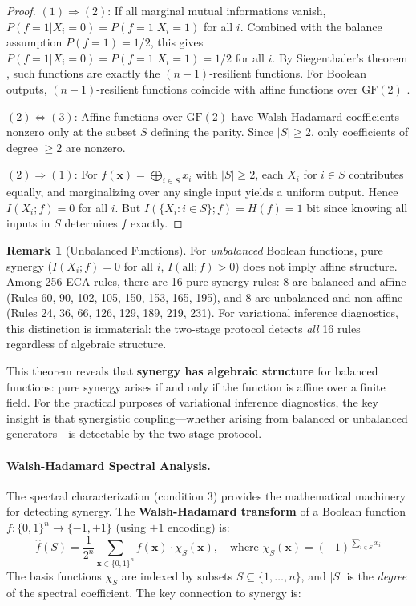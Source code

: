 \documentclass[10pt]{article} %
\theoremstyle{plain}
\theoremstyle{definition}
\newtheorem{remark}[theorem]{Remark}
\begin{document}
\begin{proof}
$(1) \Rightarrow (2)$: If all marginal mutual informations vanish, $P(f = 1 | X_i = 0) = P(f = 1 | X_i = 1)$ for all $i$. Combined with the balance assumption $P(f=1) = 1/2$, this gives $P(f = 1 | X_i = 0) = P(f = 1 | X_i = 1) = 1/2$ for all $i$. By Siegenthaler's theorem \citep{siegenthaler1984correlation}, such functions are exactly the $(n-1)$-resilient functions. For Boolean outputs, $(n-1)$-resilient functions coincide with affine functions over $\text{GF}(2)$ \citep{chor1985resilient}.

$(2) \Leftrightarrow (3)$: Affine functions over $\text{GF}(2)$ have Walsh-Hadamard coefficients nonzero only at the subset $S$ defining the parity. Since $|S| \geq 2$, only coefficients of degree $\geq 2$ are nonzero.

$(2) \Rightarrow (1)$: For $f(\mathbf{x}) = \bigoplus_{i \in S} x_i$ with $|S| \geq 2$, each $X_i$ for $i \in S$ contributes equally, and marginalizing over any single input yields a uniform output. Hence $I(X_i; f) = 0$ for all $i$. But $I(\{X_i : i \in S\}; f) = H(f) = 1$ bit since knowing all inputs in $S$ determines $f$ exactly.
\end{proof}

\begin{remark}[Unbalanced Functions]
For \emph{unbalanced} Boolean functions, pure synergy ($I(X_i; f) = 0$ for all $i$, $I(\text{all}; f) > 0$) does not imply affine structure. Among 256 ECA rules, there are 16 pure-synergy rules: 8 are balanced and affine (Rules 60, 90, 102, 105, 150, 153, 165, 195), and 8 are unbalanced and non-affine (Rules 24, 36, 66, 126, 129, 189, 219, 231). For variational inference diagnostics, this distinction is immaterial: the two-stage protocol detects \emph{all} 16 rules regardless of algebraic structure.
\end{remark}

This theorem reveals that \textbf{synergy has algebraic structure} for balanced functions: pure synergy arises if and only if the function is affine over a finite field. For the practical purposes of variational inference diagnostics, the key insight is that synergistic coupling---whether arising from balanced or unbalanced generators---is detectable by the two-stage protocol.

\paragraph{Walsh-Hadamard Spectral Analysis.} The spectral characterization (condition 3) provides the mathematical machinery for detecting synergy. The \textbf{Walsh-Hadamard transform} of a Boolean function $f: \{0,1\}^n \to \{-1, +1\}$ (using $\pm 1$ encoding) is:
\begin{equation}
\hat{f}(S) = \frac{1}{2^n} \sum_{\mathbf{x} \in \{0,1\}^n} f(\mathbf{x}) \cdot \chi_S(\mathbf{x}), \quad \text{where } \chi_S(\mathbf{x}) = (-1)^{\sum_{i \in S} x_i}
\end{equation}
The basis functions $\chi_S$ are indexed by subsets $S \subseteq \{1, \ldots, n\}$, and $|S|$ is the \emph{degree} of the spectral coefficient. The key connection to synergy is:
\end{document}
